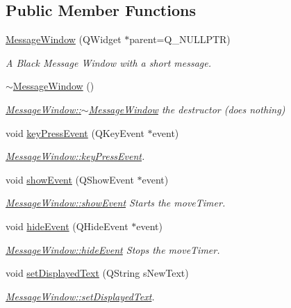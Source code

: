 \subsection*{Public Member Functions}
\begin{DoxyCompactItemize}
\item 
\mbox{\label{classMessageWindow_a177e3e28e1c3674b6115c34772d9e31f}} 
\mbox{\hyperlink{classMessageWindow_a177e3e28e1c3674b6115c34772d9e31f}{Message\+Window}} (Q\+Widget $\ast$parent=Q\+\_\+\+N\+U\+L\+L\+P\+TR)
\begin{DoxyCompactList}\small\item\em A Black Message Window with a short message. \end{DoxyCompactList}\item 
\mbox{\label{classMessageWindow_a1a4662f35424a8c9be0a9f9b04ccf86f}} 
\mbox{\hyperlink{classMessageWindow_a1a4662f35424a8c9be0a9f9b04ccf86f}{$\sim$\+Message\+Window}} ()
\begin{DoxyCompactList}\small\item\em \mbox{\hyperlink{classMessageWindow_a1a4662f35424a8c9be0a9f9b04ccf86f}{Message\+Window\+::$\sim$\+Message\+Window}} the destructor (does nothing) \end{DoxyCompactList}\item 
void \mbox{\hyperlink{classMessageWindow_adc919ddd8974835eb9f44d9cd5362f18}{key\+Press\+Event}} (Q\+Key\+Event $\ast$event)
\begin{DoxyCompactList}\small\item\em \mbox{\hyperlink{classMessageWindow_adc919ddd8974835eb9f44d9cd5362f18}{Message\+Window\+::key\+Press\+Event}}. \end{DoxyCompactList}\item 
void \mbox{\hyperlink{classMessageWindow_aee9d8dca7a7576d47eab37c8cb30a26d}{show\+Event}} (Q\+Show\+Event $\ast$event)
\begin{DoxyCompactList}\small\item\em \mbox{\hyperlink{classMessageWindow_aee9d8dca7a7576d47eab37c8cb30a26d}{Message\+Window\+::show\+Event}} Starts the move\+Timer. \end{DoxyCompactList}\item 
void \mbox{\hyperlink{classMessageWindow_aec91ce8e6e2ad404dc79f141fa9ce7b0}{hide\+Event}} (Q\+Hide\+Event $\ast$event)
\begin{DoxyCompactList}\small\item\em \mbox{\hyperlink{classMessageWindow_aec91ce8e6e2ad404dc79f141fa9ce7b0}{Message\+Window\+::hide\+Event}} Stops the move\+Timer. \end{DoxyCompactList}\item 
void \mbox{\hyperlink{classMessageWindow_ad3b6dcb371660e6a3e0ded36564afafa}{set\+Displayed\+Text}} (Q\+String s\+New\+Text)
\begin{DoxyCompactList}\small\item\em \mbox{\hyperlink{classMessageWindow_ad3b6dcb371660e6a3e0ded36564afafa}{Message\+Window\+::set\+Displayed\+Text}}. \end{DoxyCompactList}\end{DoxyCompactItemize}
